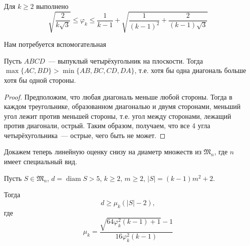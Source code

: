 \begin{theorem}
	\label{thm:varphi_k_bounds}
	\cite{costa2013valid}
	Для $k\geq 2$ выполнено
	\begin{equation*}
		\sqrt{\frac{2}{k\sqrt{3}}}
		\leq
		\varphi_k
		\leq
		\frac{1}{k-1} +
		\sqrt{
			\frac{1}{(k-1)^2}
			+
			\frac{2}{(k-1)\sqrt{3}}
		}
	\end{equation*}
\end{theorem}

Нам потребуется вспомогательная
\begin{lemma}
	\label{lemma:quadr_diag_edges}
	Пусть $ABCD$~--- выпуклый четырёхугольник на плоскости.
	Тогда $\max\{AC,BD\}>\min\{AB,BC,CD,DA\}$,
	т.е. хотя бы одна диагональ больше хотя бы одной стороны.
\end{lemma}
\begin{proof}
	Предположим, что любая диагональ меньше любой стороны.
	Тогда в каждом треугольнике, образованном диагональю и двумя сторонами,
	меньший угол лежит против меньшей стороны,
	т.е. угол между сторонами, лежащий против диагонали, острый.
	Таким образом, получаем, что все 4 угла четырёхугольника~---
	острые, чего быть не может.
\end{proof}

Докажем теперь линейную оценку снизу на диаметр множеств из $\mathfrak{M}_n$,
где $n$ имеет специальный вид.
\begin{lemma}
	Пусть $S\in\mathfrak{M}_n$,
	$d = \operatorname{diam} S > 5$,
	$k \geq 2$,
	$m \geq 2$,
	$ |S| = (k-1)m^2 + 2$.

	Тогда
	\begin{equation}
		d \geq \mu_k (|S| - 2),
	\end{equation}
	где
	\begin{equation}
		\mu_k = \frac{\sqrt{64\varphi_k^2 (k-1)+1}-1}{16\varphi_k^2 (k-1)}
	\end{equation}
\end{lemma}

